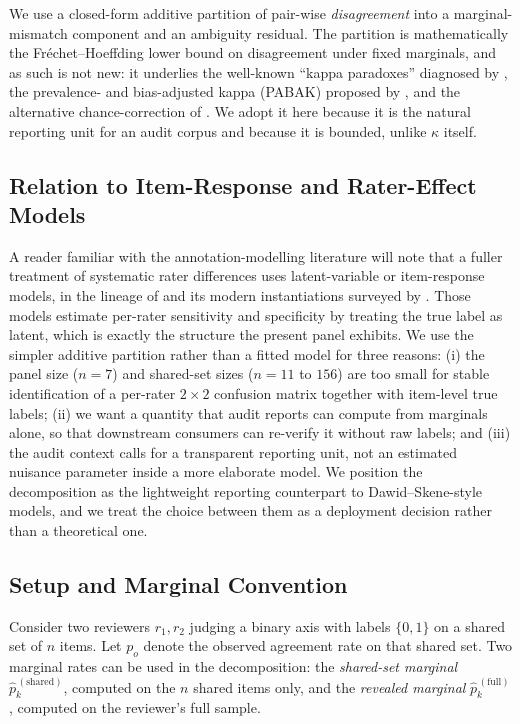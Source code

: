 \documentclass[11pt,a4paper]{article}
\begin{document}
We use a closed-form additive partition of pair-wise
\emph{disagreement} into a marginal-mismatch component and an
ambiguity residual. The partition is mathematically the
Fr\'echet--Hoeffding lower bound on disagreement under fixed
marginals, and as such is not new: it underlies the well-known
``kappa paradoxes'' diagnosed by \citet{feinstein1990high}, the
prevalence- and bias-adjusted kappa (PABAK) proposed by
\citet{byrt1993bias}, and the alternative chance-correction of
\citet{gwet2008computing}. We adopt it here because it is the
natural reporting unit for an audit corpus and because it is
bounded, unlike $\kappa$ itself.

\subsection{Relation to Item-Response and Rater-Effect Models}
\label{sec:rak-alternatives}

A reader familiar with the annotation-modelling literature will note
that a fuller treatment of systematic rater differences uses
latent-variable or item-response models, in the lineage of
\citet{dawid1979maximum} and its modern instantiations surveyed by
\citet{passonneau2014benefits}. Those models estimate per-rater
sensitivity and specificity by treating the true label as latent,
which is exactly the structure the present panel exhibits. We use
the simpler additive partition rather than a fitted model for three
reasons: (i) the panel size ($n=7$) and shared-set sizes ($n=11$ to
$156$) are too small for stable identification of a per-rater
$2\times 2$ confusion matrix together with item-level true labels;
(ii) we want a quantity that audit reports can compute from
marginals alone, so that downstream consumers can re-verify it
without raw labels; and (iii) the audit context calls for a
transparent reporting unit, not an estimated nuisance parameter
inside a more elaborate model. We position the decomposition as
the lightweight reporting counterpart to Dawid--Skene-style
models, and we treat the choice between them as a deployment
decision rather than a theoretical one.

\subsection{Setup and Marginal Convention}
\label{sec:rak-setup}

Consider two reviewers $r_1,r_2$ judging a binary axis with labels
$\{0,1\}$ on a shared set of $n$ items. Let $p_o$ denote the
observed agreement rate on that shared set. Two marginal rates can
be used in the decomposition: the \emph{shared-set marginal}
$\hat p_k^{\,(\text{shared})}$, computed on the $n$ shared items only,
and the \emph{revealed marginal} $\hat p_k^{\,(\text{full})}$,
computed on the reviewer's full sample.
\end{document}

